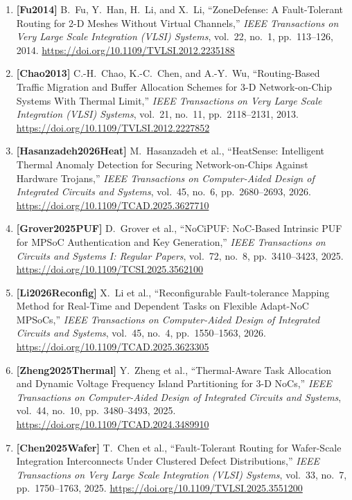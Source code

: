 \begin{enumerate}
    \item \textbf{[Fu2014]} B.~Fu, Y.~Han, H.~Li, and X.~Li, ``ZoneDefense: A Fault-Tolerant Routing for 2-D Meshes Without Virtual Channels,'' \emph{IEEE Transactions on Very Large Scale Integration (VLSI) Systems}, vol.~22, no.~1, pp.~113--126, 2014. \url{https://doi.org/10.1109/TVLSI.2012.2235188}
    \item \textbf{[Chao2013]} C.-H.~Chao, K.-C.~Chen, and A.-Y.~Wu, ``Routing-Based Traffic Migration and Buffer Allocation Schemes for 3-D Network-on-Chip Systems With Thermal Limit,'' \emph{IEEE Transactions on Very Large Scale Integration (VLSI) Systems}, vol.~21, no.~11, pp.~2118--2131, 2013. \url{https://doi.org/10.1109/TVLSI.2012.2227852}
    \item \textbf{[Hasanzadeh2026Heat]} M.~Hasanzadeh et al., ``HeatSense: Intelligent Thermal Anomaly Detection for Securing Network-on-Chips Against Hardware Trojans,'' \emph{IEEE Transactions on Computer-Aided Design of Integrated Circuits and Systems}, vol.~45, no.~6, pp.~2680--2693, 2026. \url{https://doi.org/10.1109/TCAD.2025.3627710}
    \item \textbf{[Grover2025PUF]} D.~Grover et al., ``NoCiPUF: NoC-Based Intrinsic PUF for MPSoC Authentication and Key Generation,'' \emph{IEEE Transactions on Circuits and Systems I: Regular Papers}, vol.~72, no.~8, pp.~3410--3423, 2025. \url{https://doi.org/10.1109/TCSI.2025.3562100}
    \item \textbf{[Li2026Reconfig]} X.~Li et al., ``Reconfigurable Fault-tolerance Mapping Method for Real-Time and Dependent Tasks on Flexible Adapt-NoC MPSoCs,'' \emph{IEEE Transactions on Computer-Aided Design of Integrated Circuits and Systems}, vol.~45, no.~4, pp.~1550--1563, 2026. \url{https://doi.org/10.1109/TCAD.2025.3623305}
    \item \textbf{[Zheng2025Thermal]} Y.~Zheng et al., ``Thermal-Aware Task Allocation and Dynamic Voltage Frequency Island Partitioning for 3-D NoCs,'' \emph{IEEE Transactions on Computer-Aided Design of Integrated Circuits and Systems}, vol.~44, no.~10, pp.~3480--3493, 2025. \url{https://doi.org/10.1109/TCAD.2024.3489910}
    \item \textbf{[Chen2025Wafer]} T.~Chen et al., ``Fault-Tolerant Routing for Wafer-Scale Integration Interconnects Under Clustered Defect Distributions,'' \emph{IEEE Transactions on Very Large Scale Integration (VLSI) Systems}, vol.~33, no.~7, pp.~1750--1763, 2025. \url{https://doi.org/10.1109/TVLSI.2025.3551200}


\end{enumerate}
